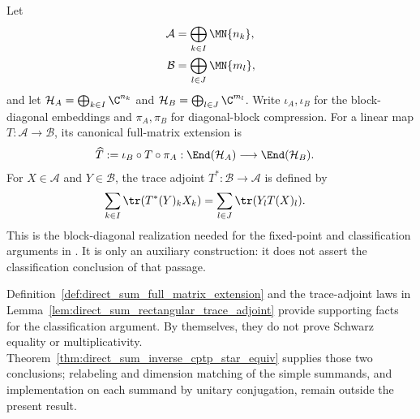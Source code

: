 \begin{definition}%
    \label{def:direct_sum_full_matrix_extension}
    \leanok
    Let
    \begin{align}
        \mathcal A
        &=\bigoplus_{k\in I}\MN{n_k}, \notag\\
        \mathcal B
        &=\bigoplus_{l\in J}\MN{m_l},
        \notag
    \end{align}
    and let $\mathcal H_A=\bigoplus_{k\in I}\C^{n_k}$ and
    $\mathcal H_B=\bigoplus_{l\in J}\C^{m_l}$. Write
    $\iota_A,\iota_B$ for the block-diagonal embeddings and
    $\pi_A,\pi_B$ for diagonal-block compression. For a linear map
    $T:\mathcal A\to\mathcal B$, its canonical full-matrix extension is
    \begin{align}
        \widehat T
        &:=\iota_B\circ T\circ\pi_A:
          \End(\mathcal H_A)\longrightarrow\End(\mathcal H_B).
        \label{eq:spectral_direct_sum_extension}
    \end{align}
    For $X\in\mathcal A$ and $Y\in\mathcal B$, the trace adjoint
    $T^*:\mathcal B\to\mathcal A$ is defined by
    \begin{align}
        \sum_{k\in I}\tr(T^*(Y)_kX_k)
        &=\sum_{l\in J}\tr(Y_lT(X)_l).
        \label{eq:spectral_direct_sum_adjoint}
    \end{align}
    This is the block-diagonal realization needed for the fixed-point and
    classification arguments in
    \cite[Appendix~C.4, lines~1980--2003]{Cirac2016MPDO_arXiv}. It is only
    an auxiliary construction: it does not assert the classification
    conclusion of that passage.
\end{definition}

Definition~\ref{def:direct_sum_full_matrix_extension} and the trace-adjoint
laws in Lemma~\ref{lem:direct_sum_rectangular_trace_adjoint} provide
supporting facts for the classification argument. By themselves, they do
not prove Schwarz equality or multiplicativity.
Theorem~\ref{thm:direct_sum_inverse_cptp_star_equiv} supplies those two
conclusions; relabeling and dimension matching of the simple summands, and
implementation on each summand by unitary conjugation, remain outside the
present result.


